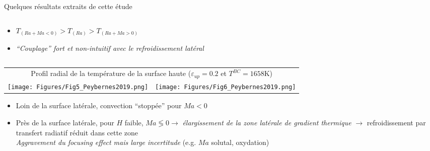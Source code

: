 \begin{frame}[fragile]

{\footnotesize Quelques résultats extraits de cette étude \cite{Peybernes2019}}
\begin{columns}[T]
    \begin{column}{0.4\textwidth}
    \begin{itemize}
\item $T_{(Ra+Ma<0)}>T_{(Ra)}>T_{(Ra+Ma>0)}$
\item \emph{``Couplage'' fort et non-intuitif avec le refroidissement latéral}
\end{itemize}
    \end{column}
    \end{columns}
\begin{tabular}{cc}
\multicolumn{2}{c}{\scriptsize Profil radial de la température de la surface haute ($\varepsilon_{up}=0.2$ et $T^{BC}=1658$K)} \\
\texttt{[image: Figures/Fig5\_Peybernes2019.png]} & \texttt{[image: Figures/Fig6\_Peybernes2019.png]}
\end{tabular}
\begin{itemize}
\item Loin de la surface latérale, convection ``stoppée'' pour $Ma<0$
\item Près de la surface latérale, pour $H$ faible, $Ma\lessgtr 0 \rightarrow$ \emph{élargissement de la zone latérale de gradient thermique} $\rightarrow$ refroidissement par transfert radiatif réduit dans cette zone \\
\emph{Aggravement du focusing effect mais large incertitude} (e.g. $Ma$ solutal, oxydation)
\end{itemize}
\end{frame}

